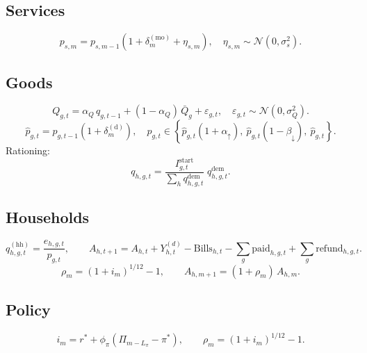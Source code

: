 \documentclass[12pt]{article}
\begin{document}
\subsection*{Services}
$$
p_{s,m}=p_{s,m-1}\left(1+\delta_m^{(\mathrm{mo})}+\eta_{s,m}\right),\quad \eta_{s,m}\sim\mathcal{N}(0,\sigma_s^2).
$$

\subsection*{Goods}
$$
Q_{g,t}=\alpha_Q\,q_{g,t-1}+(1-\alpha_Q)\,\bar{Q}_g+\varepsilon_{g,t},\quad \varepsilon_{g,t}\sim\mathcal{N}(0,\sigma_Q^2).
$$
$$
\hat{p}_{g,t}=p_{g,t-1}\left(1+\delta_m^{(\mathrm{d})}\right),\quad
p_{g,t}\in\left\{\hat{p}_{g,t}(1+\alpha_{\uparrow}),\ \hat{p}_{g,t}(1-\beta_{\downarrow}),\ \hat{p}_{g,t}\right\}.
$$
Rationing:
$$
q_{h,g,t}=\frac{I^{\mathrm{start}}_{g,t}}{\sum_h q^{\mathrm{dem}}_{h,g,t}}\;q^{\mathrm{dem}}_{h,g,t}.
$$

\subsection*{Households}
$$
q^{(\mathrm{hh})}_{h,g,t}=\frac{e_{h,g,t}}{p_{g,t}},\qquad
A_{h,t+1}=A_{h,t}+Y_{h,t}^{(d)}-\mathrm{Bills}_{h,t}-\sum_g \text{paid}_{h,g,t}+\sum_g \text{refund}_{h,g,t}.
$$
$$
\rho_m=(1+i_m)^{1/12}-1,\qquad A_{h,m+1}=(1+\rho_m)\,A_{h,m}.
$$

\subsection*{Policy}
$$
i_m=r^\ast+\phi_\pi\left(\Pi_{m-L_{\pi}}-\pi^\ast\right),\qquad
\rho_m=(1+i_m)^{1/12}-1.
$$
\end{document}
